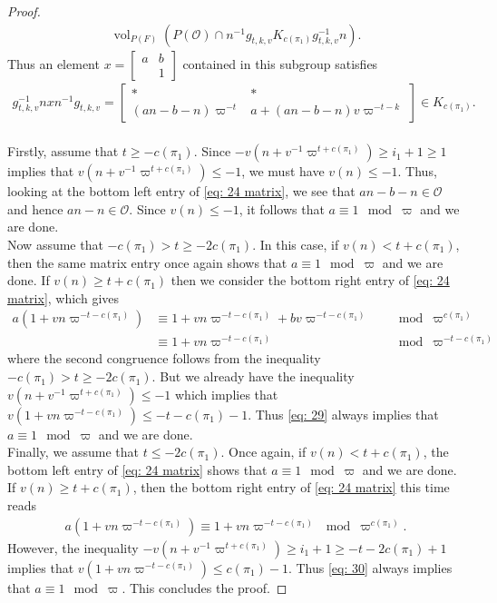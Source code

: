 \documentclass{amsart}
\theoremstyle{plain}
\theoremstyle{plain}
\theoremstyle{remark}
\DeclareMathOperator{\vol}{vol}
\begin{document}
\begin{proof}
     \begin{align*}
         \vol_{P(F)}(P(\mathcal{O})\cap n^{-1}g_{t,k,v} K_{c(\pi_1)} g_{t,k,v}^{-1}n).
     \end{align*}
     Thus an element $x=\left[\begin{smallmatrix}
         a & b\\
         & 1
     \end{smallmatrix}\right]$ contained in this subgroup satisfies 
     \begin{align}\label{eq: 24 matrix}
         g_{t,k,v}^{-1}nxn^{-1}g_{t,k,v}=\left[\begin{smallmatrix}
             * & * \\
             (an-b-n)\varpi^{-t} & a+(an-b-n)v\varpi^{-t-k}
         \end{smallmatrix}\right]\in K_{c(\pi_1)}.
     \end{align}
     \\
     Firstly, assume that $t\geq -c(\pi_1)$. Since $-v(n+v^{-1}\varpi^{t+c(\pi_1)})\geq i_1+1\geq 1$ implies that $v(n+v^{-1}\varpi^{t+c(\pi_1)})\leq -1$, we must have $v(n)\leq -1$. Thus, looking at the bottom left entry of \eqref{eq: 24 matrix}, we see that $an-b-n\in\mathcal{O}$ and hence $an-n\in\mathcal{O}$. Since $v(n)\leq -1$, it follows that $a\equiv 1\mod\varpi$ and we are done. \\
     Now assume that $-c(\pi_1)>t\geq -2c(\pi_1)$. In this case, if $v(n)< t+c(\pi_1)$, then the same matrix entry once again shows that $a\equiv1\mod\varpi$ and we are done. If $v(n)\geq t+c(\pi_1)$ then we consider the bottom right entry of \eqref{eq: 24 matrix}, which gives 
     \begin{align}
      \nonumber   a(1+vn\varpi^{-t-c(\pi_1)})&\equiv1 + vn\varpi^{-t-c(\pi_1)}+bv\varpi^{-t-c(\pi_1)}&&\mod\varpi^{c(\pi_1)}\\
         &\equiv1+vn\varpi^{-t-c(\pi_1)}&&\mod\varpi^{-t-c(\pi_1)}\label{eq: 29}
     \end{align}
     where the second congruence follows from the inequality $-c(\pi_1)>t\geq-2c(\pi_1)$. But we already have the inequality $v(n+v^{-1}\varpi^{t+c(\pi_1)})\leq -1$ which implies that $v(1+vn\varpi^{-t-c(\pi_1)})\leq -t-c(\pi_1)-1$. Thus \eqref{eq: 29} always implies that $a\equiv1\mod\varpi$ and we are done.\\
     Finally, we assume that $t\leq -2c(\pi_1)$. Once again, if $v(n)<t+c(\pi_1)$, the bottom left entry of \eqref{eq: 24 matrix} shows that $a\equiv 1\mod\varpi$ and we are done. If $v(n)\geq t+c(\pi_1)$, then the bottom right entry of \eqref{eq: 24 matrix} this time reads
    \begin{align}\label{eq: 30}a(1+vn\varpi^{-t-c(\pi_1)})\equiv 1+vn\varpi^{-t-c(\pi_1)}\mod\varpi^{c(\pi_1)}.\end{align}
    However, the inequality $-v(n+v^{-1}\varpi^{t+c(\pi_1)})\geq i_1+1\geq-t-2c(\pi_1)+1$ implies that $v(1+vn\varpi^{-t-c(\pi_1)})\leq c(\pi_1)-1$. Thus \eqref{eq: 30} always implies that $a\equiv1\mod\varpi$. This concludes the proof.
\end{proof}
\end{document}
